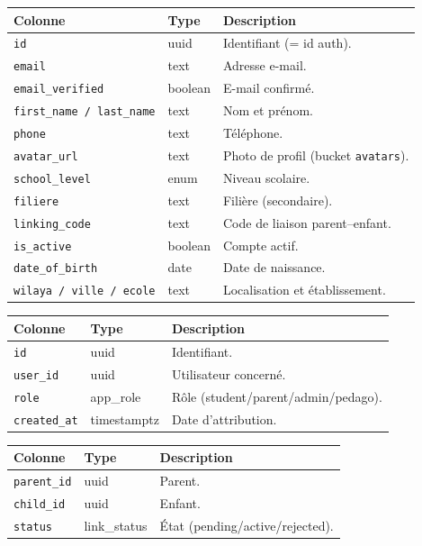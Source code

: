 \begin{longtable}{p{3.6cm}p{2.6cm}p{8cm}}
\toprule \textbf{Colonne} & \textbf{Type} & \textbf{Description} \\ \midrule \endhead
\texttt{id} & uuid & Identifiant (= id auth). \\
\texttt{email} & text & Adresse e-mail. \\
\texttt{email\_verified} & boolean & E-mail confirmé. \\
\texttt{first\_name / last\_name} & text & Nom et prénom. \\
\texttt{phone} & text & Téléphone. \\
\texttt{avatar\_url} & text & Photo de profil (bucket \texttt{avatars}). \\
\texttt{school\_level} & enum & Niveau scolaire. \\
\texttt{filiere} & text & Filière (secondaire). \\
\texttt{linking\_code} & text & Code de liaison parent--enfant. \\
\texttt{is\_active} & boolean & Compte actif. \\
\texttt{date\_of\_birth} & date & Date de naissance. \\
\texttt{wilaya / ville / ecole} & text & Localisation et établissement. \\
\bottomrule
\end{longtable}

\begin{longtable}{p{3.6cm}p{2.6cm}p{8cm}}
\toprule \textbf{Colonne} & \textbf{Type} & \textbf{Description} \\ \midrule \endhead
\texttt{id} & uuid & Identifiant. \\
\texttt{user\_id} & uuid & Utilisateur concerné. \\
\texttt{role} & app\_role & Rôle (student/parent/admin/pedago). \\
\texttt{created\_at} & timestamptz & Date d'attribution. \\
\bottomrule
\end{longtable}

\begin{longtable}{p{3.6cm}p{2.6cm}p{8cm}}
\toprule \textbf{Colonne} & \textbf{Type} & \textbf{Description} \\ \midrule \endhead
\texttt{parent\_id} & uuid & Parent. \\
\texttt{child\_id} & uuid & Enfant. \\
\texttt{status} & link\_status & État (pending/active/rejected). \\
\bottomrule
\end{longtable}

